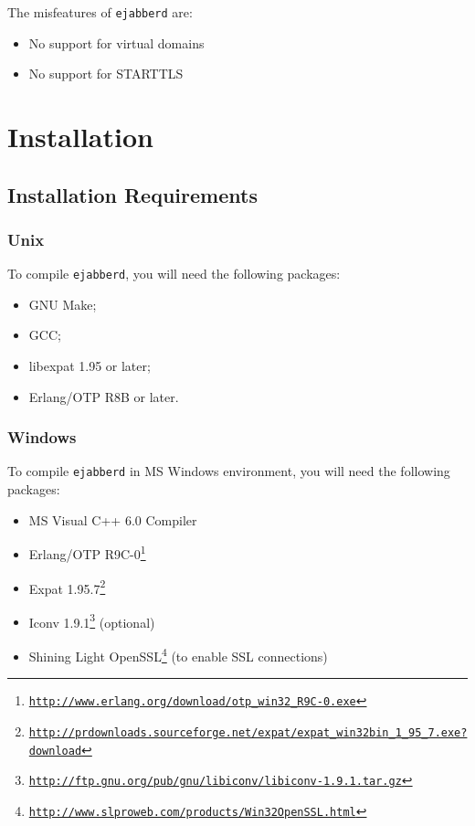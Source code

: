 \documentclass[a4paper,10pt]{article}
\newcommand{\ejabberd}{\texttt{ejabberd}}
\gdef\footahref#1#2{#2\footnote{\href{#1}{\texttt{#1}}}}
\begin{document}
The misfeatures of \ejabberd{} are:
\begin{itemize}
\item No support for virtual domains
\item No support for STARTTLS
\end{itemize}


\section{Installation}
\label{sec:installation}

\subsection{Installation Requirements}
\label{sec:installreq}

\subsubsection{Unix}
\label{sec:installrequnix}

To compile \ejabberd{}, you will need the following packages:
\begin{itemize}
\item GNU Make;
\item GCC;
\item libexpat 1.95 or later;
\item Erlang/OTP R8B or later.
\end{itemize}

\subsubsection{Windows}
\label{sec:installreqwin}

To compile \ejabberd{} in MS Windows environment, you will need the following
packages:
\begin{itemize}
\item MS Visual C++ 6.0 Compiler
\item \footahref{http://www.erlang.org/download/otp\_win32\_R9C-0.exe}{Erlang/OTP R9C-0}
\item \footahref{http://prdownloads.sourceforge.net/expat/expat\_win32bin\_1\_95\_7.exe?download}{Expat 1.95.7}
\item
\footahref{http://ftp.gnu.org/pub/gnu/libiconv/libiconv-1.9.1.tar.gz}{Iconv 1.9.1}
(optional)
\item \footahref{http://www.slproweb.com/products/Win32OpenSSL.html}{Shining Light OpenSSL}
(to enable SSL connections)
\end{itemize}
\end{document}
